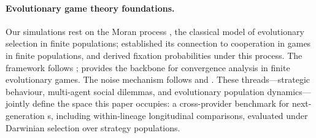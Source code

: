 \paragraph{Evolutionary game theory foundations.}
Our simulations rest on the Moran process \citep{Moran1958_random}, the classical
model of evolutionary selection in finite populations; \citet{Nowak2004_cooperation}
established its connection to cooperation in \IPD games in finite populations, and
\citet{Traulsen2006_fixation} derived fixation probabilities under this process.
The \IPD framework follows \citet{Axelrod1984_evolution,Axelrod1981_evolution};
\citet{Nowak2006_evolutionary} provides the backbone for convergence analysis in
finite evolutionary games. The noise mechanism follows
\citet{WuAxelrod1995_noise} and \citet{WahlNowak1999_noise}.
These threads---\LLM strategic behaviour, multi-agent social dilemmas, and
evolutionary population dynamics---jointly define the space this paper occupies:
a cross-provider benchmark for next-generation \LLM{}s, including within-lineage
longitudinal comparisons, evaluated under Darwinian selection over \IPD strategy
populations.
